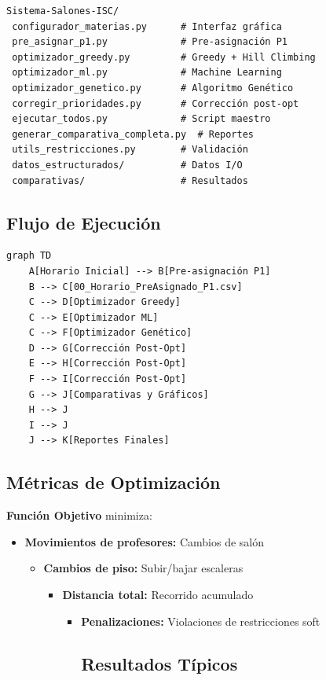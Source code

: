 \begin{itemize}
\begin{itemize}
\begin{itemize}
\begin{itemize}
\begin{enumerate}
\begin{itemize}
{\begin{itemize}
\begin{itemize}
\begin{enumerate}
\begin{itemize}
\begin{enumerate}
\begin{itemize}
\begin{verbatim}
Sistema-Salones-ISC/
 configurador_materias.py      # Interfaz gráfica
 pre_asignar_p1.py             # Pre-asignación P1
 optimizador_greedy.py         # Greedy + Hill Climbing
 optimizador_ml.py             # Machine Learning
 optimizador_genetico.py       # Algoritmo Genético
 corregir_prioridades.py       # Corrección post-opt
 ejecutar_todos.py             # Script maestro
 generar_comparativa_completa.py  # Reportes
 utils_restricciones.py        # Validación
 datos_estructurados/          # Datos I/O
 comparativas/                 # Resultados
\end{verbatim}


\subsection{Flujo de Ejecución}

\begin{verbatim}
graph TD
    A[Horario Inicial] --> B[Pre-asignación P1]
    B --> C[00_Horario_PreAsignado_P1.csv]
    C --> D[Optimizador Greedy]
    C --> E[Optimizador ML]
    C --> F[Optimizador Genético]
    D --> G[Corrección Post-Opt]
    E --> H[Corrección Post-Opt]
    F --> I[Corrección Post-Opt]
    G --> J[Comparativas y Gráficos]
    H --> J
    I --> J
    J --> K[Reportes Finales]
\end{verbatim}


\subsection{Métricas de Optimización}

\textbf{Función Objetivo} minimiza:

\begin{itemize}
\item \textbf{Movimientos de profesores:} Cambios de salón
\begin{itemize}
\item \textbf{Cambios de piso:} Subir/bajar escaleras
\begin{itemize}
\item \textbf{Distancia total:} Recorrido acumulado
\begin{itemize}
\item \textbf{Penalizaciones:} Violaciones de restricciones soft

\subsection{Resultados Típicos}



\end{itemize}
\end{itemize}
\end{itemize}
\end{itemize}
\end{itemize}
\end{enumerate}
\end{itemize}
\end{enumerate}
\end{itemize}
\end{itemize}}
\end{itemize}
\end{enumerate}
\end{itemize}
\end{itemize}
\end{itemize}
\end{itemize}
